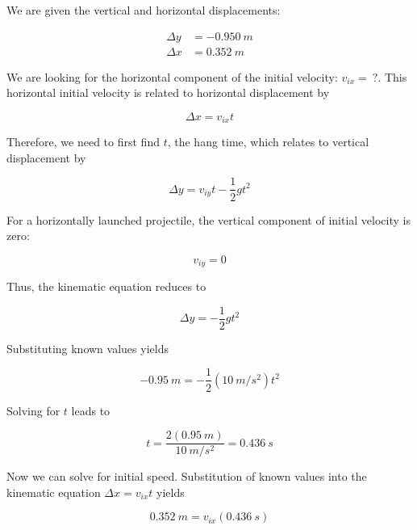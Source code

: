 \documentclass[../main-physics-problems.tex]{subfiles}
\begin{document}
\begin{questions}
\begin{solution}
We are given the vertical and horizontal displacements:

\begin{align*}
    \Delta y &= -\SI{0.950}{m} \\[1ex]
    \Delta x &= \SI{0.352}{m}
\end{align*}

We are looking for the horizontal component of the initial velocity: $v_{ix} =\ ?$. This horizontal initial velocity is related to horizontal displacement by

\begin{equation*}
    \Delta x = v_{ix} t
\end{equation*}

Therefore, we need to first find $t$, the hang time, which relates to vertical displacement by

\begin{equation*}
    \Delta y = v_{iy} t - \frac{1}{2} g t^2
\end{equation*}


For a horizontally launched projectile, the vertical component of initial velocity is zero:

\begin{equation*}
    v_{iy} = 0
\end{equation*}

Thus, the kinematic equation reduces to

\begin{equation*}
    \Delta y = - \frac{1}{2} g t^2
\end{equation*}

Substituting known values yields

\begin{equation*}
    -\SI{0.95}{m} = - \frac{1}{2}\left(\SI{10}{m/s^2}\right)t^2
\end{equation*}

Solving for $t$ leads to

\begin{equation*}
    t = \frac{2(\SI{0.95}{m})}{\SI{10}{m/s^2}} = \SI{0.436}{s}
\end{equation*}

Now we can solve for initial speed. Substitution of known values into the kinematic equation $\Delta x = v_{ix} t$ yields

\begin{equation*}
    \SI{0.352}{m} = v_{ix} (\SI{0.436}{s})
\end{equation*}


\end{solution}
\end{questions}
\end{document}
